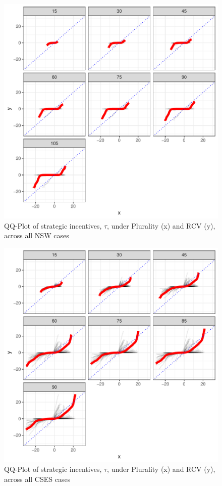 \documentclass[11pt, letter, margin = 2 in]{article}
\begin{document}
\begin{figure}[!h]
	\centering
	\includegraphics[width = \textwidth]{"../output/figures/australia_sv_qq_trunc"}
	\caption{QQ-Plot of strategic incentives, $\tau$, under Plurality (x) and RCV (y), across all NSW cases}
	\label{fig:figure1}
\end{figure}

\begin{figure}[!h]
	\centering
	\includegraphics[width = \textwidth]{"../output/figures/cses_qq"}
	\caption{QQ-Plot of strategic incentives, $\tau$, under Plurality (x) and RCV (y), across all CSES cases}
	\label{fig:figure1}
\end{figure}
\end{document}
